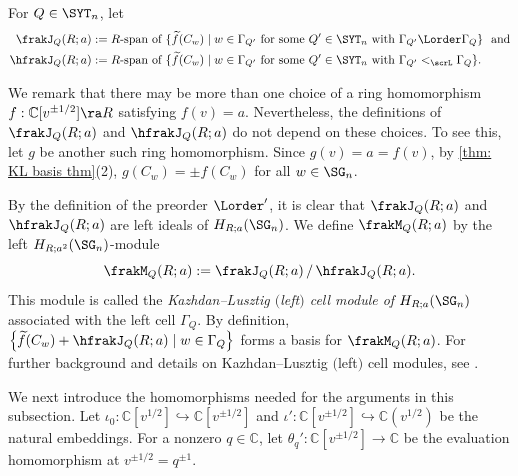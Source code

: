 \documentclass[12pt, reqno]{amsart}
\theoremstyle{plain}
\theoremstyle{definition}
\numberwithin{equation}{section}
\numberwithin{figure}{section}
\numberwithin{table}{section}
\def\C{\mathbb C}
\begin{document}
For $Q \in \SYT_n$, let 
\begin{align*}
\frakJ_Q(R;a) 
& := R\text{-span of }  \{\widetilde{f}(C_w) \mid  \text{$w \in \Gamma_{Q'}$ for some $Q' \in \SYT_n$ with $\Gamma_{Q'} \Lorder \Gamma_Q$} \}\ \  \text{and} \\
\hfrakJ_Q(R;a)
& := R\text{-span of } \{\widetilde{f}(C_w) \mid \text{$w \in \Gamma_{Q'}$ for some $Q' \in \SYT_n$ with $\Gamma_{Q'} <_{\scrL} \Gamma_Q$}  \}.
\end{align*}


We remark that there may be more than one choice of a ring homomorphism $f:\C[v^{\pm 1/2}]\ra R$ satisfying $f(v)=a$. Nevertheless, the definitions of $\frakJ_Q(R;a)$ and $\hfrakJ_Q(R;a)$ do not depend on these choices.
To see this, let $g$ be another such ring homomorphism.
Since $g(v) = a = f(v)$, by \cref{thm: KL basis thm}(2),  $g(C_w) = \pm f(C_w)$ for all $w \in \SG_n$.



By the definition of the preorder $\Lorder'$, it is clear that $\frakJ_Q(R;a)$ and $\hfrakJ_Q(R;a)$ are left ideals of $H_{R;a}(\SG_n)$.
We define $\frakM_Q(R;a)$ by the left $H_{R;a^2}(\SG_{n})$-module 
\[
\frakM_Q(R;a) := \frakJ_Q(R;a)  \,/\, \hfrakJ_Q(R;a).
\]
This module is called the \emph{Kazhdan--Lusztig $($left$)$ cell module of $H_{R;a}(\SG_{n})$} associated with the left cell $\Gamma_Q$.
By definition, $\left\{ \widetilde{f}(C_w) + \hfrakJ_Q(R;a)  \mid  w \in \Gamma_Q \right\}$ forms a basis for $\frakM_Q(R;a)$.
For further background and details on Kazhdan--Lusztig $($left$)$ cell modules, see \cite{79KL, 96GL, 99Mat, 03Geordie}.



We next introduce the homomorphisms needed for the arguments in this subsection.
Let $\iota_0:\C[v^{1/2}]\hookrightarrow \C[v^{\pm 1/2}]$ and $\iota':\C[v^{\pm 1/2}]\hookrightarrow \C(v^{1/2})$
be the natural embeddings. 
For a nonzero $q\in\C$, let $\theta_q':\C[v^{\pm 1/2}]\to\C$
be the evaluation homomorphism at $v^{\pm 1/2} = q^{\pm 1}$.
\end{document}
